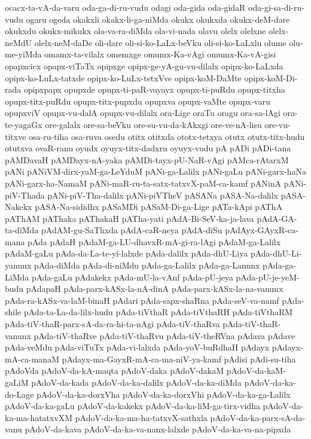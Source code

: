 {ocacx-ta-vA-da-varu
oda-ga-di-ru-vudu
odagi
oda-gida
oda-gidaR
oda-gi-sa-di-ru-vudu
ogaru
ogeda
okakxli
okakx-li-ga-niMda
okukx
okukxda
okukx-deM-dare
okukxdu
okukx-mikukx
ola-va-ra-diMda
ola-vi-nada
olavu
olelx
olelxne
olelx-neMdU
olelx-neM-daDe
oli-dare
oli-si-ko-LaLx-beVku
oli-si-ko-LaLxlu
olume
olu-me-yiMda
omamx-ta-vilalx
omemxge
omumx-Ka-vAgi
omumx-Ka-vA-gisi
opapxcicx
opapx-viTaTx
opipxge
opipx-ge-yA-gu-vu-dilalx
opipx-ko-LaLxda
opipx-ko-LuLx-tatxde
opipx-ko-LuLx-tetxVve
opipx-koM-DaMte
opipx-koM-Di-rada
opipxpapx
opupxde
opupx-ti-paR-vayayx
opupx-ti-puRdu
opupx-titxha
opupx-titx-puRdu
opupx-titx-pupxdu
opupxva
opupx-vaMte
opupx-varu
opupxviV
opupx-vu-dalA
opupx-vu-dilalx
ora-Lige
oraTu
oragu
ora-sa-lAgi
ora-te-yagaGx
ore-galalx
ore-sa-beVku
ore-su-vu-da-kAkxgi
ore-ve-nA-lisu
ore-vu-titxve
osa-ru-tiha
osa-ruva
osedu
otitx
otitxda
ototx-tetxya
otutx
otutx-titx-hudu
otutxva
ovaR-ranu
oyudx
oyuyx-titx-dadxru
oyuyx-vudu
pA
pADi
pADi-tana
pAMDavaH
pAMDayx-nA-yaka
pAMDi-tayx-pU-NaR-vAgi
pAMca-rAtarxM
pANi
pANiVM-dirx-yaM-ga-LeYduM
pANi-ga-Lalilx
pANi-gaLu
pANi-garx-haNa
pANi-garx-ha-NamaM
pANi-maR-ru-ta-satx-tatxvX-paM-ca-kamf
pANinA
pANi-piV-Thada
pANi-piV-Tha-dalilx
pANi-piVTheV
pASANa
pASA-Na-dalilx
pASA-Nakekx
pASA-Na-sididhx
pASaMDi
pASaM-Di-ga-Lige
pATa-kApi
pAThA
pAThAM
pAThaka
pAThakaH
pATha-yati
pAdA-Bi-SeV-ka-ja-lava
pAdA-GA-ta-diMda
pAdAM-gu-SaThxda
pAdA-caR-neya
pAdA-diSu
pAdAyx-GAyxR-ca-mana
pAda
pAdaH
pAdaM-ga-LU-dhavxR-mA-gi-ra-lAgi
pAdaM-ga-Lalilx
pAdaM-gaLu
pAda-da-La-te-yi-lalxde
pAda-dalilx
pAda-dhU-Liya
pAda-dhU-Li-yanunx
pAda-diMda
pAda-di-niMdu
pAda-ga-Lalilx
pAda-ga-Lanunx
pAda-ga-LiMda
pAda-gaLu
pAdakekx
pAda-mU-la-vAnf
pAda-pU-jeya
pAda-pU-je-yeM-budu
pAdapaH
pAda-parx-kASx-la-nA-dinA
pAda-parx-kASx-la-na-vanunx
pAda-ra-kASx-va-laM-binaH
pAdari
pAda-sapx-shaRna
pAda-seV-va-namf
pAda-shile
pAda-ta-La-da-lilx-hudu
pAda-tiVthaR
pAda-tiVthaRH
pAda-tiVthaRM
pAda-tiV-thaR-parx-sA-da-ra-hi-ta-nAgi
pAda-tiV-thaRva
pAda-tiV-thaR-vanunx
pAda-tiV-thaRve
pAda-tiV-thaRvu
pAda-tiV-theRVna
pAdava
pAdave
pAda-veMdu
pAda-viTuTx
pAda-vi-lalxda
pAda-yoV-buRdhaH
pAdayx
pAdayx-mA-ca-manaM
pAdayx-ma-GayxR-mA-ca-ma-niV-ya-kamf
pAdisi
pAdi-su-tiha
pAdoVda
pAdoV-da-kA-maqta
pAdoV-daka
pAdoV-dakaM
pAdoV-da-kaM-gaLiM
pAdoV-da-kada
pAdoV-da-ka-dalilx
pAdoV-da-ka-diMda
pAdoV-da-ka-do-Lage
pAdoV-da-ka-dorxVha
pAdoV-da-ka-dorxVhi
pAdoV-da-ka-ga-Lalilx
pAdoV-da-ka-gaLu
pAdoV-da-kakekx
pAdoV-da-ka-liM-ga-tirx-vidha
pAdoV-da-ka-ma-hatatxvXM
pAdoV-da-ka-ma-ha-tatxvX-sathxla
pAdoV-da-ka-parx-sA-da-vanu
pAdoV-da-kava
pAdoV-da-ka-va-nanx-lalxde
pAdoV-da-ka-va-na-pipxda
}

